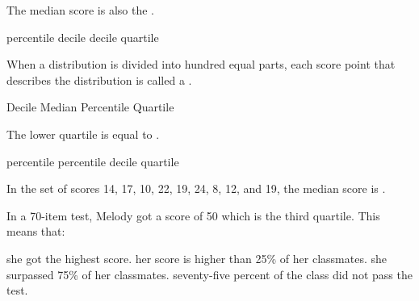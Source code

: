 
  
\begin{questions}

\question The  median  score  is also  the  \blank. 
\begin{multicols}{4}
\begin{choices} 
\choice {}  percentile
\CorrectChoice {}  decile
\choice {}  decile
\choice {}  quartile
\end{choices}
\end{multicols}


\question When  a  distribution  is  divided  into  hundred  equal  parts,  each  score point  that  describes the  distribution  is called  a    \blank. 
\begin{multicols}{4}
\begin{choices} 
\choice Decile 
\choice Median 
\CorrectChoice Percentile 
\choice Quartile 
\end{choices}
\end{multicols}

\question The  lower quartile  is equal to \blank.  
\begin{multicols}{4}
\begin{choices} 
\choice {}  percentile
\CorrectChoice {}  percentile
\choice {}  decile 
\choice {}  quartile
\end{choices}
\end{multicols}

\question In the set of scores 14, 17, 10,  22,  19,  24,  8,  12,  and  19,  the  median score is  \blank. 
\begin{multicols}{4}
\begin{choices} 
\end{choices}
\end{multicols}

\question In a 70-item test,   Melody  got  a  score  of  50  which  is  the  third  quartile.    This  means  that: 
\begin{choices} 
\choice she  got  the  highest  score. 
\choice her score is  higher than  25\%  of  her classmates.
\CorrectChoice she  surpassed  75\%  of  her classmates.
\choice seventy-five  percent  of  the  class did  not  pass  the  test.  
\end{choices}


\end{questions}
